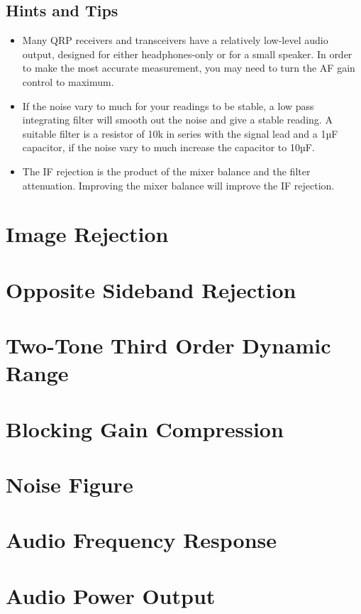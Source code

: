 \documentclass[10pt,letterpaper]{book}
\begin{document}
\subsection*{Hints and Tips}
\begin{itemize}
	\item Many QRP receivers and transceivers have a relatively low-level audio output, designed for either headphones-only or for a small speaker. In order to make the most accurate measurement, you may need to turn the AF gain control to maximum.
	\item If the noise vary to much for your readings to be stable, a low pass integrating filter will smooth out the noise and give a stable reading. A suitable filter is a resistor of 10k in series with the signal lead and a 1µF capacitor, if the noise vary to much increase the capacitor to 10µF.  
	\item The IF rejection is the product of the mixer balance and the filter attenuation. Improving the mixer balance will improve the IF rejection.
\end{itemize}





\section{Image Rejection}
\section{Opposite Sideband Rejection}
\section{Two-Tone Third Order Dynamic Range}
\section{Blocking Gain Compression}
\section{Noise Figure}
\section{Audio Frequency Response}
\section{Audio Power Output}
\end{document}
